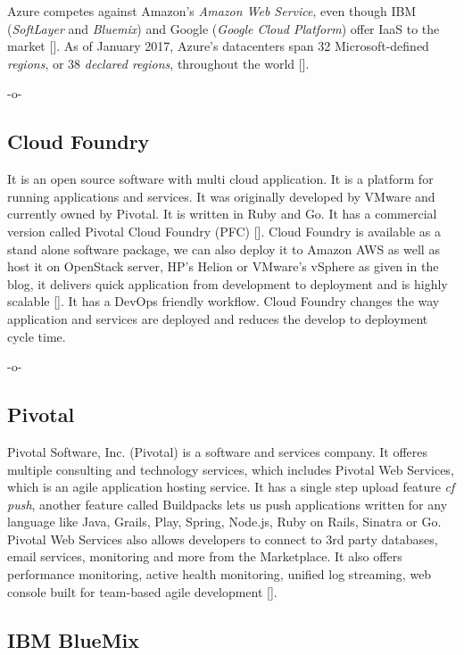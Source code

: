 Azure competes against Amazon's \textit{Amazon Web Service}, even though IBM
(\textit{SoftLayer} and \textit{Bluemix}) and Google (\textit{Google Cloud Platform})
offer IaaS to the market [\cite{www-aws-amzn, www-softlayer-ibm,
  www-bluemix-ibm,www-cloud-google}].  As of January 2017, Azure's
datacenters span 32 Microsoft-defined \textit{regions}, or 38 \textit{declared
regions}, throughout the world [\cite{www-azure-msft}].

    -o-

\subsection{Cloud Foundry}

It is an open source software with multi cloud application. It is a
platform for running applications and services. It was originally
developed by VMware and currently owned by Pivotal. It is written in
Ruby and Go. It has a commercial version called Pivotal Cloud Foundry
(PFC) [\cite{www-cloudfoundry-book}]. Cloud Foundry is available as a
stand alone software package, we can also deploy it to Amazon AWS as
well as host it on OpenStack server, HP's Helion or VMware's vSphere
as given in the blog, it delivers quick application from development
to deployment and is highly scalable [\cite{www-cloudfoundry-blog}]. It
has a DevOps friendly workflow.  Cloud Foundry changes the way
application and services are deployed and reduces the develop to
deployment cycle time.

-o-

\subsection{Pivotal}

Pivotal Software, Inc. (Pivotal) is a software and services
company. It offeres multiple consulting and technology services, which
includes Pivotal Web Services, which is an agile application hosting
service. It has a single step upload feature \textit{cf push}, another
feature called Buildpacks lets us push applications written for any
language like Java, Grails, Play, Spring, Node.js, Ruby on Rails,
Sinatra or Go. Pivotal Web Services also allows developers to connect
to 3rd party databases, email services, monitoring and more from the
Marketplace. It also offers performance monitoring, active health
monitoring, unified log streaming, web console built for team-based
agile development [\cite{pivotal-www}].

\subsection{IBM BlueMix}

